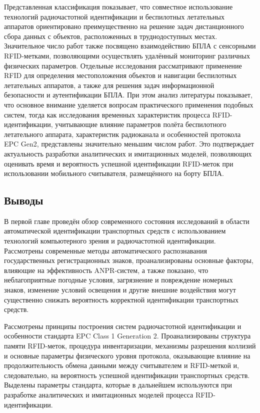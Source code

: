 \documentclass[12pt]{article}
\theoremstyle{definition}
\begin{document}
Представленная классификация показывает, что совместное использование технологий радиочастотной идентификации и беспилотных летательных аппаратов ориентировано преимущественно на решение задач дистанционного сбора данных с объектов, расположенных в труднодоступных местах. Значительное число работ также посвящено взаимодействию БПЛА с сенсорными RFID-метками, позволяющими осуществлять удалённый мониторинг различных физических параметров. Отдельные исследования рассматривают применение RFID для определения местоположения объектов и навигации беспилотных летательных аппаратов, а также для решения задач информационной безопасности и аутентификации БПЛА. При этом анализ литературы показывает, что основное внимание уделяется вопросам практического применения подобных систем, тогда как исследования временных характеристик процесса RFID-идентификации, учитывающие влияние параметров полёта беспилотного летательного аппарата, характеристик радиоканала и особенностей протокола EPC Gen2, представлены значительно меньшим числом работ. Это подтверждает актуальность разработки аналитических и имитационных моделей, позволяющих оценивать время и вероятность успешной идентификации RFID-меток при использовании мобильного считывателя, размещённого на борту БПЛА.

\subsection*{Выводы}

В первой главе проведён обзор современного состояния исследований в области автоматической идентификации транспортных средств с использованием технологий компьютерного зрения и радиочастотной идентификации. Рассмотрены современные методы автоматического распознавания государственных регистрационных знаков, проанализированы основные факторы, влияющие на эффективность ANPR-систем, а также показано, что неблагоприятные погодные условия, загрязнение и повреждение номерных знаков, изменение условий освещения и другие внешние воздействия могут существенно снижать вероятность корректной идентификации транспортных средств.

Рассмотрены принципы построения систем радиочастотной идентификации и особенности стандарта EPC Class 1 Generation 2. Проанализированы структура памяти RFID-меток, процедура инвентаризации, механизмы разрешения коллизий и основные параметры физического уровня протокола, оказывающие влияние на продолжительность обмена данными между считывателем и RFID-меткой и, следовательно, на вероятность успешной идентификации транспортных средств. Выделены параметры стандарта, которые в дальнейшем используются при разработке аналитических и имитационных моделей процесса RFID-идентификации.
\end{document}
